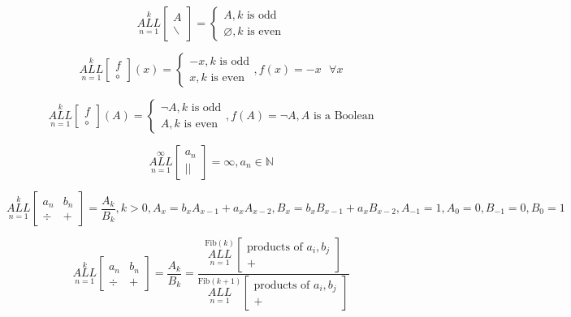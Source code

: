 \documentclass{article}
\begin{document}
$$\underset{n=1}{\overset{k}{ALL}} \begin{bmatrix}
A \\
\backslash
\end{bmatrix} =  \left\{ \begin{array}{rcl}
A, k \text{ is odd} \\ \varnothing, k \text{ is even} \end{array}\right.$$

$$\underset{n=1}{\overset{k}{ALL}} \begin{bmatrix}
f \\
\circ
\end{bmatrix}(x) = \left\{ \begin{array}{rcl}
-x, k \text{ is odd} \\ x, k \text{ is even} \end{array}\right., f(x)=-x \text{ }\forall x$$

$$\underset{n=1}{\overset{k}{ALL}} \begin{bmatrix}
f \\
\circ
\end{bmatrix}(A) = \left\{ \begin{array}{rcl}
\neg A, k \text{ is odd} \\ A, k \text{ is even} \end{array}\right., f(A)=\neg A, A \text{ is a Boolean}$$

$$\underset{n=1}{\overset{\infty}{ALL}} \begin{bmatrix}
a_n \\
||
\end{bmatrix} = \infty, a_n \in \mathbb{N}$$

$${\scriptstyle \underset{n=1}{\overset{k}{ALL}} \begin{bmatrix}
a_n & b_n \\
\div & +
\end{bmatrix} = \frac{A_k}{B_k}, k > 0, A_x = b_xA_{x-1}+a_xA_{x-2}, B_x = b_xB_{x-1} + a_xB_{x-2}, A_{-1}=1, A_0 = 0, B_{-1}=0, B_0=1}$$

$$\underset{n=1}{\overset{k}{ALL}} \begin{bmatrix}
a_n & b_n \\
\div & +
\end{bmatrix}=\frac{A_k}{B_k}=\frac{\underset{n=1}{\overset{\text{Fib}(k)}{ALL}} \begin{bmatrix}
\text{products of } a_i, b_j \\
+
\end{bmatrix}}{\underset{n=1}{\overset{\text{Fib}(k+1)}{ALL}} \begin{bmatrix}
\text{products of } a_i, b_j \\
+
\end{bmatrix}}$$
\end{document}

